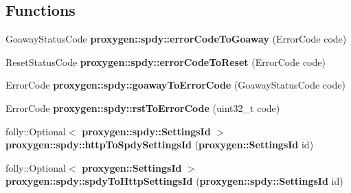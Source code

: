 \subsection*{Functions}
\begin{DoxyCompactItemize}
\item 
Goaway\+Status\+Code {\bf proxygen\+::spdy\+::error\+Code\+To\+Goaway} (Error\+Code code)
\item 
Reset\+Status\+Code {\bf proxygen\+::spdy\+::error\+Code\+To\+Reset} (Error\+Code code)
\item 
Error\+Code {\bf proxygen\+::spdy\+::goaway\+To\+Error\+Code} (Goaway\+Status\+Code code)
\item 
Error\+Code {\bf proxygen\+::spdy\+::rst\+To\+Error\+Code} (uint32\+\_\+t code)
\item 
folly\+::\+Optional$<$ {\bf proxygen\+::spdy\+::\+Settings\+Id} $>$ {\bf proxygen\+::spdy\+::http\+To\+Spdy\+Settings\+Id} ({\bf proxygen\+::\+Settings\+Id} id)
\item 
folly\+::\+Optional$<$ {\bf proxygen\+::\+Settings\+Id} $>$ {\bf proxygen\+::spdy\+::spdy\+To\+Http\+Settings\+Id} ({\bf proxygen\+::spdy\+::\+Settings\+Id} id)
\end{DoxyCompactItemize}
